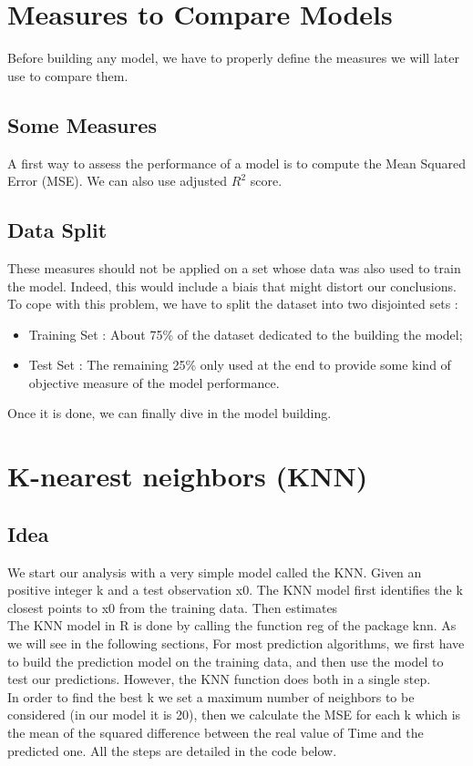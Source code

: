 \documentclass[]{report}
\begin{document}
\section{Measures to Compare Models}
Before building any model, we have to properly define the measures we will later use to compare them. 

\subsection{Some Measures}
A first way to assess the performance of a model is to compute the Mean Squared Error (MSE). We can also use adjusted $R^2$ score.

\subsection{Data Split}
These measures should not be applied on a set whose data was also used to train the model. Indeed, this would include a biais that might distort our conclusions. To cope with this problem, we have to split the dataset into two disjointed sets : 
\begin{itemize}
	\item Training Set : About 75\% of the dataset dedicated to the building the model;
	\item Test Set : The remaining 25\% only used at the end to provide some kind of objective measure of the model performance.
\end{itemize} 

Once it is done, we can finally dive in the model building.

\section{K-nearest neighbors (KNN)}
\subsection{Idea}
We start our analysis with a very simple model called the KNN.
Given an positive integer k and a test observation x0. The KNN model first identifies the k closest points to x0 from the training data. Then estimates \\ 

The KNN model in R is done by calling the function reg of the package knn. As we will see in the following sections, For most prediction algorithms, we first have to build the prediction model on the training data, and then use the model to test our predictions. However, the KNN function does both in a single step.\\ 
In order to find the best k we set a maximum number of neighbors to be considered (in our model it is 20), then we calculate the MSE for each k which is the mean of the squared difference between the real value of Time and the predicted one. All the steps are detailed in the code below.\\
\end{document}
